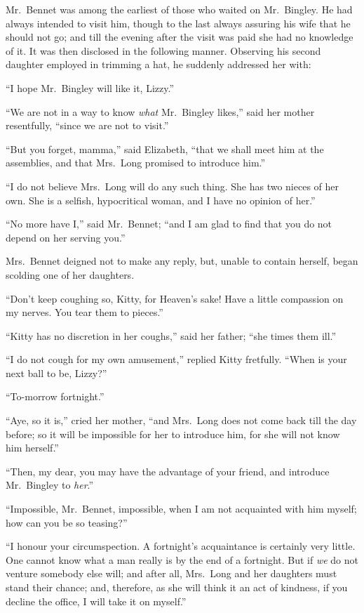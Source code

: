 \documentclass[12pt,english,oneside]{book}
\begin{document}

Mr.\ Bennet was among the earliest of those who waited on Mr.\ Bingley.
He had always intended to visit him, though to the last always assuring
his wife that he should not go; and till the evening after the visit
was paid she had no knowledge of it. It was then disclosed in the
following manner. Observing his second daughter employed in trimming
a hat, he suddenly addressed her with:

{}``I hope Mr.\ Bingley will like it, Lizzy.''

{}``We are not in a way to know \textit{what} Mr.\ Bingley likes,''
said her mother resentfully, {}``since we are not to visit.''

{}``But you forget, mamma,'' said Elizabeth, {}``that we shall
meet him at the assemblies, and that Mrs.\ Long promised to introduce
him.''

{}``I do not believe Mrs.\ Long will do any such thing. She has
two nieces of her own. She is a selfish, hypocritical woman, and I
have no opinion of her.''

{}``No more have I,'' said Mr.\ Bennet; {}``and I am glad to find
that you do not depend on her serving you.''

Mrs.\ Bennet deigned not to make any reply, but, unable to contain
herself, began scolding one of her daughters.

{}``Don't keep coughing so, Kitty, for Heaven's sake! Have a little
compassion on my nerves. You tear them to pieces.''

{}``Kitty has no discretion in her coughs,'' said her father; {}``she
times them ill.''

{}``I do not cough for my own amusement,'' replied Kitty fretfully.
{}``When is your next ball to be, Lizzy?''\ 

{}``To-morrow fortnight.''

{}``Aye, so it is,'' cried her mother, {}``and Mrs.\ Long does
not come back till the day before; so it will be impossible for her
to introduce him, for she will not know him herself.''

{}``Then, my dear, you may have the advantage of your friend, and
introduce Mr.\ Bingley to \textit{her}.''

{}``Impossible, Mr.\ Bennet, impossible, when I am not acquainted
with him myself; how can you be so teasing?''\ 

{}``I honour your circumspection. A fortnight's acquaintance is certainly
very little. One cannot know what a man really is by the end of a
fortnight. But if \textit{we} do not venture somebody else will; and
after all, Mrs.\ Long and her daughters must stand their chance;
and, therefore, as she will think it an act of kindness, if you decline
the office, I will take it on myself.''
\end{document}
